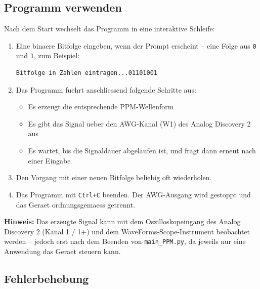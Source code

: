\subsection*{Programm verwenden}

Nach dem Start wechselt das Programm in eine interaktive Schleife:

\begin{enumerate}
  \item Eine binaere Bitfolge eingeben, wenn der Prompt erscheint --
        eine Folge aus \texttt{0} und \texttt{1}, zum Beispiel:
\begin{lstlisting}
Bitfolge in Zahlen eintragen...01101001
\end{lstlisting}
  \item Das Programm fuehrt anschliessend folgende Schritte aus:
  \begin{itemize}
    \item Es erzeugt die entsprechende PPM-Wellenform
    \item Es gibt das Signal ueber den AWG-Kanal (W1) des Analog Discovery 2 aus
    \item Es wartet, bis die Signaldauer abgelaufen ist, und fragt dann erneut
          nach einer Eingabe
  \end{itemize}
  \item Den Vorgang mit einer neuen Bitfolge beliebig oft wiederholen.
  \item Das Programm mit \texttt{Ctrl+C} beenden. Der AWG-Ausgang wird gestoppt
        und das Geraet ordnungsgemaess getrennt.
\end{enumerate}

\textbf{Hinweis:} Das erzeugte Signal kann mit dem Oszilloskopeingang des
Analog Discovery 2 (Kanal 1 / 1+) und dem WaveForms-Scope-Instrument beobachtet
werden -- jedoch erst nach dem Beenden von \texttt{main\_PPM.py}, da jeweils nur
eine Anwendung das Geraet steuern kann.

\subsection*{Fehlerbehebung}

